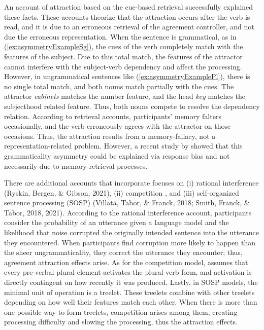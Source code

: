 An account of attraction based on the cue-based retrieval \citep{LewisVasishth:2005} successfully explained these facts. These accounts theorize that the attraction occurs after the verb is read, and it is due to an erroneous retrieval of the agreement controller, and not due the erroneous representation. When the sentence is grammatical, as in (\ref{ex:asymmetryExampleSg}), the cues of the verb completely match with the features of the subject. Due to this total match, the features of the attractor cannot interfere with the subject-verb dependency and affect the processing. However, in ungrammatical sentences like (\ref{ex:asymmetryExamplePl}), there is no single total match, and both nouns match partially with the cues. The attractor \emph{cabinets} matches the number feature, and the head \emph{key} matches the subjecthood related feature. Thus, both nouns compete to resolve the dependency relation. According to retrieval accounts, participants' memory falters occasionally, and the verb erroneously agrees with the attractor on those occasions. Thus, the attraction results from a memory-fallacy, not a representation-related problem. However, a recent study by  showed that this grammaticality asymmetry could be explained via response bias and not necessarily due to memory-retrieval processes. 

There are additional accounts that incorporate focuses on (i) rational interference (Ryskin, Bergen, \& Gibson, 2021), (ii) competition \citep{NozariOmaki2022}, and (iii) self-organized sentence processing (SOSP) (Villata, Tabor, \& Franck, 2018; Smith, Franck, \& Tabor, 2018, 2021). According to the rational interference account, participants consider the probability of an utterance given a language model and the likelihood that noise corrupted the originally intended sentence into the utterance they encountered. When participants find corruption more likely to happen than the sheer ungrammaticality, they correct the utterance they encounter; thus, agreement attraction effects arise. As for the competition model,  assumes that every pre-verbal plural element activates the plural verb form, and activation is directly contingent on how recently it was produced. Lastly, in SOSP models, the minimal unit of operation is a treelet. These treelets combine with other treelets depending on how well their features match each other. When there is more than one possible way to form treelets, competition arises among them, creating processing difficulty and slowing the processing, thus the attraction effects. 

